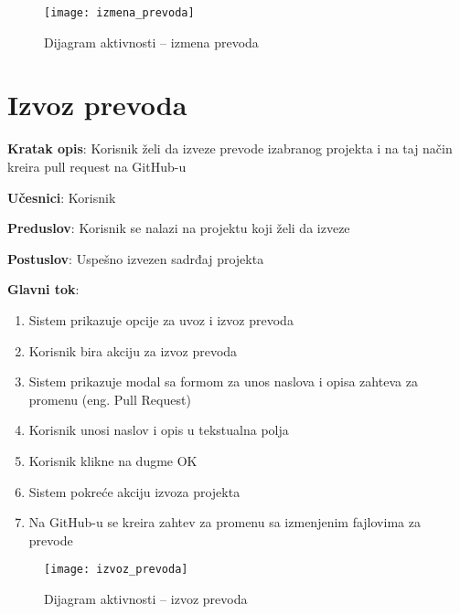 \begin{figure}[H]
    \centering
    \texttt{[image: izmena\_prevoda]}
    \caption{Dijagram aktivnosti -- izmena prevoda}
\end{figure}


\section{Izvoz prevoda}

\textbf{Kratak opis}: Korisnik želi da izveze prevode izabranog projekta i 
na taj način kreira pull request na GitHub-u

\textbf{Učesnici}: Korisnik

\textbf{Preduslov}: Korisnik se nalazi na projektu koji želi da izveze

\textbf{Postuslov}: Uspešno izvezen sadrđaj projekta

\textbf{Glavni tok}:
\begin{enumerate}
    \item Sistem prikazuje opcije za uvoz i izvoz prevoda
    \item Korisnik bira akciju za izvoz prevoda
    \item Sistem prikazuje modal sa formom za unos naslova i opisa 
    zahteva za promenu (eng. Pull Request)
    \item Korisnik unosi naslov i opis u tekstualna polja
    \item Korisnik klikne na dugme OK
    \item Sistem pokreće akciju izvoza projekta
    \item Na GitHub-u se kreira zahtev za promenu sa izmenjenim fajlovima za prevode
\end{enumerate}

\begin{figure}[H]
    \centering
    \texttt{[image: izvoz\_prevoda]}
    \caption{Dijagram aktivnosti -- izvoz prevoda}
\end{figure}
